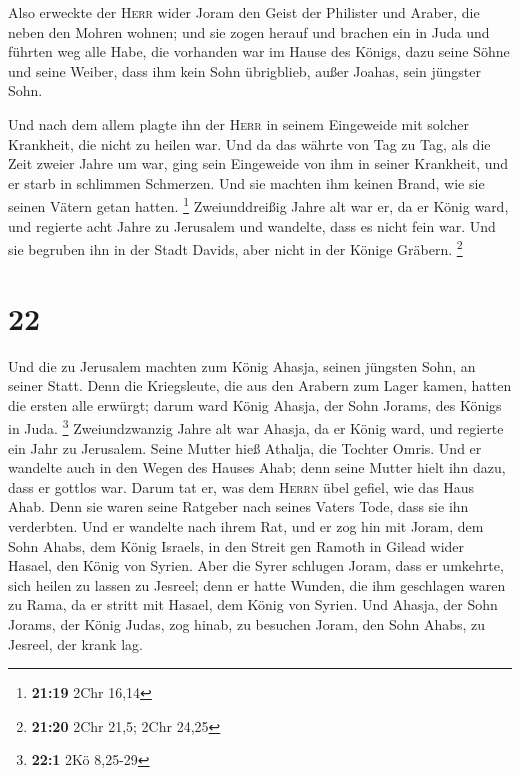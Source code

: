  Also erweckte der \textsc{Herr} wider Joram den Geist
der Philister und Araber, die neben den Mohren wohnen; 
und sie zogen herauf und brachen ein in Juda und führten weg alle Habe,
die vorhanden war im Hause des Königs, dazu seine Söhne und seine
Weiber, dass ihm kein Sohn übrigblieb, außer Joahas, sein jüngster Sohn.

 Und nach dem allem plagte ihn der \textsc{Herr} in
seinem Eingeweide mit solcher Krankheit, die nicht zu heilen war.
 Und da das währte von Tag zu Tag, als die Zeit zweier
Jahre um war, ging sein Eingeweide von ihm in seiner Krankheit, und er
starb in schlimmen Schmerzen. Und sie machten ihm keinen Brand, wie sie
seinen Vätern getan hatten. \footnote{\textbf{21:19} 2Chr 16,14}
 Zweiunddreißig Jahre alt war er, da er König ward, und
regierte acht Jahre zu Jerusalem und wandelte, dass es nicht fein war.
Und sie begruben ihn in der Stadt Davids, aber nicht in der Könige
Gräbern. \footnote{\textbf{21:20} 2Chr 21,5; 2Chr 24,25}

\hypertarget{section-4}{%
\section{22}\label{section-4}}

 Und die zu Jerusalem machten zum König Ahasja, seinen
jüngsten Sohn, an seiner Statt. Denn die Kriegsleute, die aus den
Arabern zum Lager kamen, hatten die ersten alle erwürgt; darum ward
König Ahasja, der Sohn Jorams, des Königs in Juda. \footnote{\textbf{22:1}
  2Kö 8,25-29}  Zweiundzwanzig Jahre alt war Ahasja, da er
König ward, und regierte ein Jahr zu Jerusalem. Seine Mutter hieß
Athalja, die Tochter Omris.  Und er wandelte auch in den
Wegen des Hauses Ahab; denn seine Mutter hielt ihn dazu, dass er gottlos
war.  Darum tat er, was dem \textsc{Herrn} übel gefiel,
wie das Haus Ahab. Denn sie waren seine Ratgeber nach seines Vaters
Tode, dass sie ihn verderbten.  Und er wandelte nach ihrem
Rat, und er zog hin mit Joram, dem Sohn Ahabs, dem König Israels, in den
Streit gen Ramoth in Gilead wider Hasael, den König von Syrien. Aber die
Syrer schlugen Joram,  dass er umkehrte, sich heilen zu
lassen zu Jesreel; denn er hatte Wunden, die ihm geschlagen waren zu
Rama, da er stritt mit Hasael, dem König von Syrien. Und Ahasja, der
Sohn Jorams, der König Judas, zog hinab, zu besuchen Joram, den Sohn
Ahabs, zu Jesreel, der krank lag.


